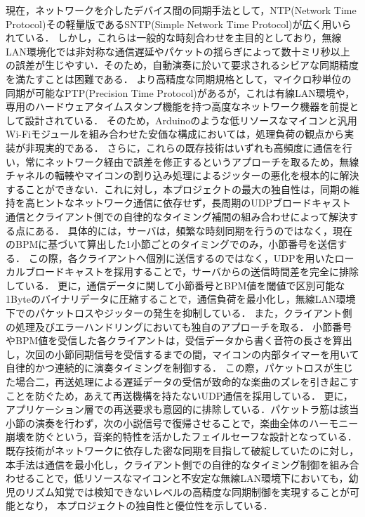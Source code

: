 現在，ネットワークを介したデバイス間の同期手法として，NTP(Network Time Protocol)その軽量版であるSNTP(Simple Network Time Protocol)が広く用いられている\cite{NTPSNTP}．
しかし，これらは一般的な時刻合わせを主目的としており，無線LAN環境化では非対称な通信遅延やパケットの揺らぎによって数十ミリ秒以上の誤差が生じやすい．そのため，自動演奏に於いて要求されるシビアな同期精度を満たすことは困難である．
より高精度な同期規格として，マイクロ秒単位の同期が可能なPTP(Precision Time Protocol)\cite{PTP}があるが，これは有線LAN環境や，専用のハードウェアタイムスタンプ機能を持つ高度なネットワーク機器を前提として設計されている．
そのため，Arduinoのような低リソースなマイコンと汎用Wi-Fiモジュールを組み合わせた安価な構成においては，処理負荷の観点から実装が非現実的である．
さらに，これらの既存技術はいずれも高頻度に通信を行い，常にネットワーク経由で誤差を修正するというアプローチを取るため，無線チャネルの輻輳やマイコンの割り込み処理によるジッターの悪化を根本的に解決することができない．これに対し，本プロジェクトの最大の独自性は，同期の維持を高ヒントなネットワーク通信に依存せず，長周期のUDPブロードキャスト通信とクライアント側での自律的なタイミング補間の組み合わせによって解決する点にある．
具体的には，サーバは，頻繁な時刻同期を行うのではなく，現在のBPMに基づいて算出した1小節ごとのタイミングでのみ，小節番号を送信する．
この際，各クライアントへ個別に送信するのではなく，UDPを用いたローカルブロードキャストを採用することで，サーバからの送信時間差を完全に排除している．
更に，通信データに関して小節番号とBPM値を閾値で区別可能な1Byteのバイナリデータに圧縮することで，通信負荷を最小化し，無線LAN環境下でのパケットロスやジッターの発生を抑制している．
また，クライアント側の処理及びエラーハンドリングにおいても独自のアプローチを取る．
小節番号やBPM値を受信した各クライアントは，受信データから書く音符の長さを算出し，次回の小節同期信号を受信するまでの間，マイコンの内部タイマーを用いて自律的かつ連続的に演奏タイミングを制御する．
この際，パケットロスが生じた場合二，再送処理による遅延データの受信が致命的な楽曲のズレを引き起こすことを防ぐため，あえて再送機構を持たないUDP通信を採用している．
更に，アプリケーション層での再送要求も意図的に排除している．パケットラ筋は該当小節の演奏を行わず，次の小説信号で復帰させることで，楽曲全体のハーモニー崩壊を防ぐという，音楽的特性を活かしたフェイルセーフな設計となっている．
既存技術がネットワークに依存した密な同期を目指して破綻していたのに対し，本手法は通信を最小化し，クライアント側での自律的なタイミング制御を組み合わせることで，低リソースなマイコンと不安定な無線LAN環境下においても，幼児のリズム知覚では検知できないレベルの高精度な同期制御を実現することが可能となり，
本プロジェクトの独自性と優位性を示している．